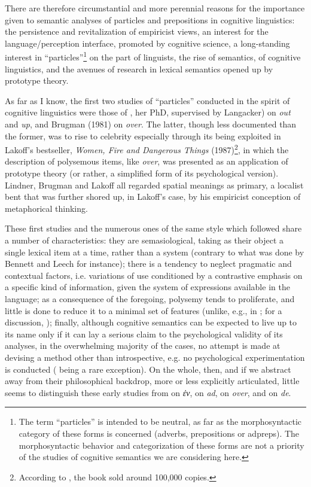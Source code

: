 \documentclass[output=paper]{langscibook}
\begin{document}
There are therefore circumstantial and more perennial reasons for the importance given to semantic analyses of particles and prepositions in cognitive linguistics: the persistence and revitalization of empiricist views, an interest for the language\slash perception interface, promoted by cognitive science, a long-standing interest in “particles”\footnote{\textrm{ The term “particles” is intended to be neutral, as far as the morphosyntactic category of these forms is concerned (adverbs, prepositions or adpreps). The morphosyntactic behavior and categorization of these forms are not a priority of the studies of cognitive semantics we are considering here. }} on the part of linguists, the rise of semantics, of cognitive linguistics, and the avenues of research in lexical semantics opened up by prototype theory.

As far as I know, the first two studies of “particles” conducted in the spirit of cognitive linguistics were those of \citet{lindner_lexico-semantic_1981}, her PhD, supervised by Langacker) on \textit{out} and \textit{up}, and Brugman (1981) on \textit{over}. The latter, though less documented than the former, was to rise to celebrity especially through its being exploited in Lakoff’s bestseller, \textit{Women, Fire and Dangerous Things} (1987)\footnote{\textrm{ According to \citet{dirven_does_2001}, the book sold around 100,000 copies. }}, in which the description of polysemous items, like \textit{over}, was presented as an application of prototype theory (or rather, a simplified form of its psychological version). Lindner, Brugman and Lakoff all regarded spatial meanings as primary, a localist bent that was further shored up, in Lakoff’s case, by his empiricist conception of metaphorical thinking.

These first studies and the numerous ones of the same style which followed share a number of characteristics: they are semasiological, taking as their object a single lexical item at a time, rather than a system (contrary to what was done by Bennett and Leech for instance); there is a tendency to neglect pragmatic and contextual factors, i.e. variations of use conditioned by a contrastive emphasis on a specific kind of information, given the system of expressions available in the language; as a consequence of the foregoing, polysemy tends to proliferate, and little is done to reduce it to a minimal set of features (unlike, e.g., in \citealt{pottier_systematique_1962}; for a discussion, \citealt{fortis_probleme_2009}); finally, although cognitive semantics can be expected to live up to its name only if it can lay a serious claim to the psychological validity of its analyses, in the overwhelming majority of the cases, no attempt is made at devising a method other than introspective, e.g. no psychological experimentation is conducted (\citealt{sandra_network_1995} being a rare exception). On the whole, then, and if we abstract away from their philosophical backdrop, more or less explicitly articulated, little seems to distinguish these early studies from \citet{aristotle_physics_1957} on \textit{ἐν}, \citet{leibniz_analysis_1986} on \textit{ad}, \citet{harris_hermes_1773} on \textit{over}, and \citet{condillac_cours_1775} on \textit{de}.
\end{document}
